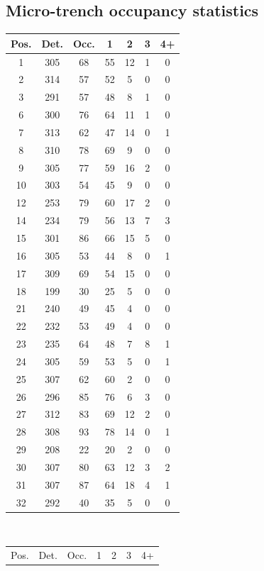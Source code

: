 \documentclass[pdftex,12pt,a4paper]{report}
\begin{document}
\begin{appendices}
\section{Micro-trench occupancy statistics}

\begin{table}[H]
\begin{tabular}[t]{ c | c | c | c | c | c | c }
\hline
Pos. & Det. & Occ. & 1 & 2 & 3 & 4+
\\
\hline\hline
1 & 305 & 68 & 55 & 12 & 1 & 0
\\
2 & 314 & 57 & 52 & 5 & 0 & 0
\\
3 & 291 & 57 & 48 & 8 & 1 & 0
\\
6 & 300 & 76 & 64 & 11 & 1 & 0
\\
7 & 313 & 62 & 47 & 14 & 0 & 1
\\
8 & 310 & 78 & 69 & 9 & 0 & 0
\\
9 & 305 & 77 & 59 & 16 & 2 & 0
\\
10 & 303 & 54 & 45 & 9 & 0 & 0
\\
12 & 253 & 79 & 60 & 17 & 2 & 0
\\
14 & 234 & 79 & 56 & 13 & 7 & 3
\\
15 & 301 & 86 & 66 & 15 & 5 & 0
\\
16 & 305 & 53 & 44 & 8 & 0 & 1
\\
17 & 309 & 69 & 54 & 15 & 0 & 0
\\
18 & 199 & 30 & 25 & 5 & 0 & 0
\\
21 & 240 & 49 & 45 & 4 & 0 & 0
\\
22 & 232 & 53 & 49 & 4 & 0 & 0
\\
23 & 235 & 64 & 48 & 7 & 8 & 1
\\
24 & 305 & 59 & 53 & 5 & 0 & 1
\\
25 & 307 & 62 & 60 & 2 & 0 & 0
\\
26 & 296 & 85 & 76 & 6 & 3 & 0
\\
27 & 312 & 83 & 69 & 12 & 2 & 0
\\
28 & 308 & 93 & 78 & 14 & 0 & 1
\\
29 & 208 & 22 & 20 & 2 & 0 & 0
\\
30 & 307 & 80 & 63 & 12 & 3 & 2
\\
31 & 307 & 87 & 64 & 18 & 4 & 1
\\
32 & 292 & 40 & 35 & 5 & 0 & 0
\end{tabular}
~
\begin{tabular}[t]{ c | c | c | c | c | c | c }
\hline
Pos. & Det. & Occ. & 1 & 2 & 3 & 4+

\end{tabular}
\end{table}
\end{appendices}
\end{document}
